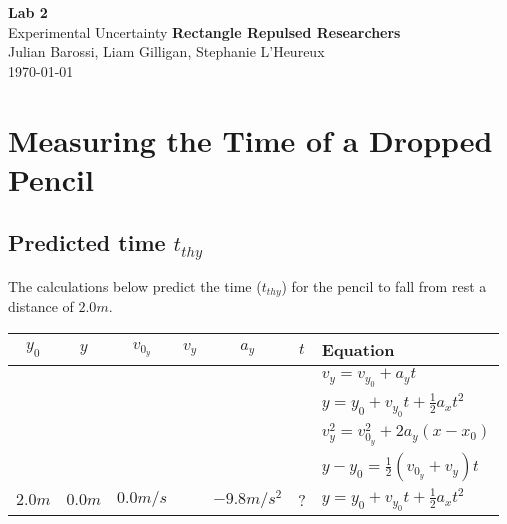 \documentclass[11pt, letterpaper, includehead]{article}
\begin{document}
  \begin{titlepage} 
    \begin{center}
      \Huge{\textbf{Lab 2}}\\
      \Huge{Experimental Uncertainty}
      \vfill
      \large{\textbf{Rectangle Repulsed Researchers}}\\
      \large{Julian Barossi, Liam Gilligan, Stephanie L'Heureux}\\
      \vspace{0.5cm}
      \normalsize
      \today
    \end{center}
  \end{titlepage}

  \tableofcontents
  \pagebreak %


  \pagestyle{fancy}
  \fancyhead{}

  \section{Measuring the Time of a Dropped Pencil} %
  
  \subsection{Predicted time $t_{thy}$} %
  The calculations below predict the time ($t_{thy}$) for the pencil to 
  fall from rest a distance of $2.0m$.

  \begin{tabular}{| c | c | c | c | c | c | l |} 
    \hline
    $y_0$ & $y$  & $v_{0_y}$ & $v_{y}$ & $a_y$ & $t$ & Equation \\ 
    \hline \hline
    \color{red}{$\times$} & \color{LimeGreen}{\checkmark} & \color{LimeGreen}{\checkmark} & \color{LimeGreen}{\checkmark} & \color{LimeGreen}{\checkmark} & \color{LimeGreen}{\checkmark} & $v_y = v_{y_0} + a_yt$ \\ 
    \hline
    \color{LimeGreen}{\checkmark} & \color{LimeGreen}{\checkmark} & \color{LimeGreen}{\checkmark} & \color{red}{$\times$} & \color{LimeGreen}{\checkmark} & \color{LimeGreen}{\checkmark} & $y = y_0 + v_{y_0}t + \frac{1}{2}a_xt^2$\\ 
    \hline
    \color{LimeGreen}{\checkmark} & \color{LimeGreen}{\checkmark} & \color{LimeGreen}{\checkmark} & \color{LimeGreen}{\checkmark} & \color{LimeGreen}{\checkmark} & \color{red}{$\times$} & $v_y^2 = v^2_{0_y} + 2a_y(x - x_0)$\\
    \hline
    \color{LimeGreen}{\checkmark} & \color{LimeGreen}{\checkmark} & \color{LimeGreen}{\checkmark} &  \color{LimeGreen}{\checkmark} &  \color{red}{$\times$} & \color{LimeGreen}{\checkmark} & $y - y_0 = \frac{1}{2}(v_{0_y} + v_y)t$\\
    \hline\hline
    $2.0m$ & $0.0m$ & $0.0m/s$ &  & $-9.8m/s^2$ & ? & $y = y_0 + v_{y_0}t + \frac{1}{2}a_xt^2$ \\
    \hline
  \end{tabular}
\end{document}
